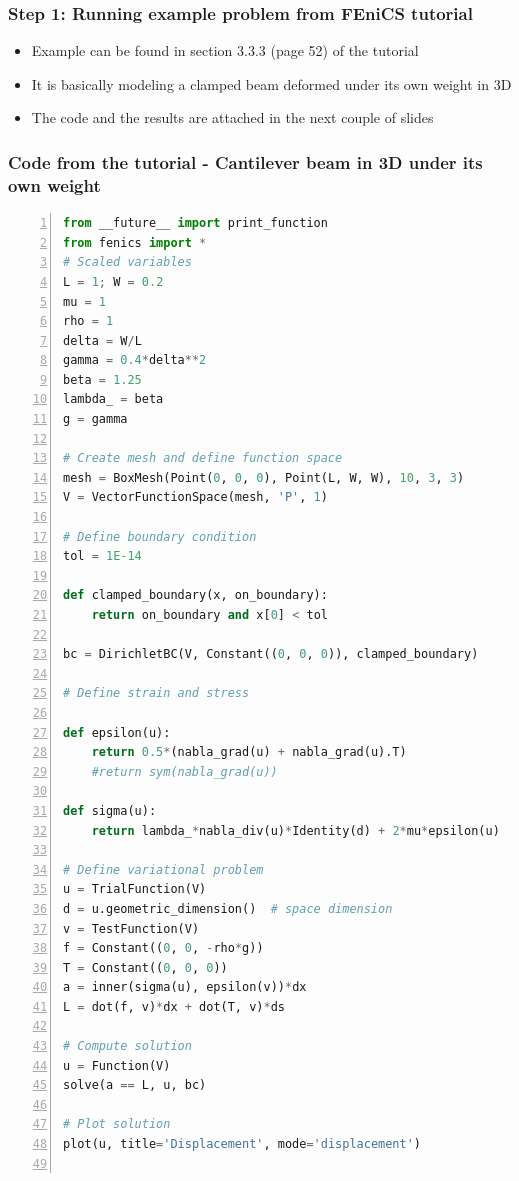 \documentclass{beamer}
\begin{document}
 \begin{frame}
\frametitle{Step 1: Running example problem from FEniCS tutorial}
\begin{itemize}
		\vfill
		\item{Example can be found in section 3.3.3 (page 52) of the tutorial}
		\vfill
		\item{It is basically modeling a clamped beam deformed under its own weight in 3D}
		\vfill
		\item{The code and the results are attached in the next couple of slides}
		\vfill
\end{itemize}
\end{frame}


 \begin{frame}
\frametitle{Code from the tutorial - Cantilever beam in 3D under its own weight}
\begin{lstlisting}[language=Python, basicstyle=\ttfamily\tiny,  keywordstyle=\color{blue},  numbers=left,  stepnumber=1, numbersep=10pt, tabsize=4, showspaces=false, showstringspaces=false]
from __future__ import print_function
from fenics import *
# Scaled variables
L = 1; W = 0.2
mu = 1
rho = 1
delta = W/L
gamma = 0.4*delta**2
beta = 1.25
lambda_ = beta
g = gamma

# Create mesh and define function space
mesh = BoxMesh(Point(0, 0, 0), Point(L, W, W), 10, 3, 3)
V = VectorFunctionSpace(mesh, 'P', 1)

# Define boundary condition
tol = 1E-14

def clamped_boundary(x, on_boundary):
    return on_boundary and x[0] < tol

bc = DirichletBC(V, Constant((0, 0, 0)), clamped_boundary)

# Define strain and stress

def epsilon(u):
    return 0.5*(nabla_grad(u) + nabla_grad(u).T)
    #return sym(nabla_grad(u))

def sigma(u):
    return lambda_*nabla_div(u)*Identity(d) + 2*mu*epsilon(u)

# Define variational problem
u = TrialFunction(V)
d = u.geometric_dimension()  # space dimension
v = TestFunction(V)
f = Constant((0, 0, -rho*g))
T = Constant((0, 0, 0))
a = inner(sigma(u), epsilon(v))*dx
L = dot(f, v)*dx + dot(T, v)*ds

# Compute solution
u = Function(V)
solve(a == L, u, bc)

# Plot solution
plot(u, title='Displacement', mode='displacement')


\end{lstlisting}
\end{frame}
\end{document}
